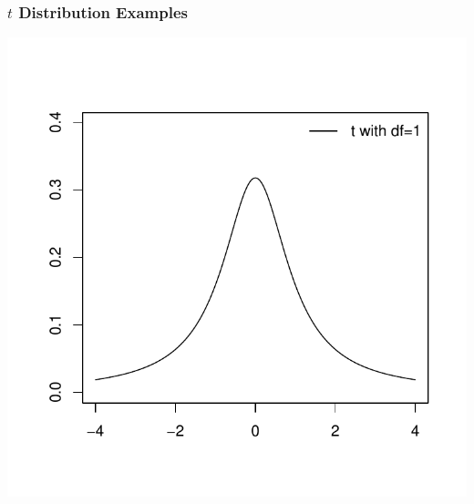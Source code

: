 \documentclass[slides]{beamer}
\begin{document}
\begin{frame}
\frametitle{$t$ Distribution Examples}
\begin{center}
\includegraphics{lec16-001}
\end{center}
\end{frame}
\end{document}
